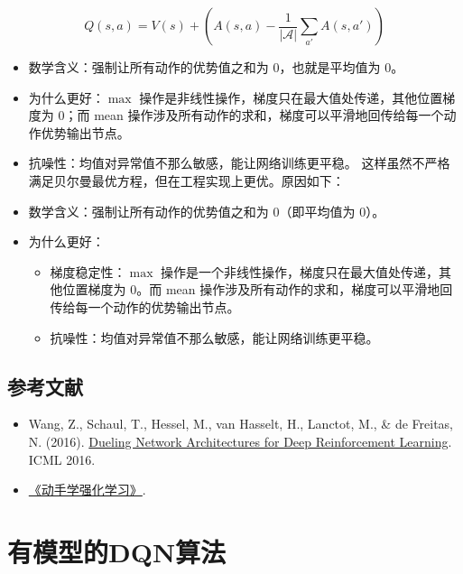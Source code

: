 \[
Q(s,a)=V(s)+(A(s,a)-\frac{1}{|\mathcal{A}|}\sum_{a'}A(s,a'))
\]

\begin{itemize}
\item
  数学含义：强制让所有动作的优势值之和为 \(0\)，也就是平均值为 \(0\)。
\item
  为什么更好：\(\max\) 操作是非线性操作，梯度只在最大值处传递，其他位置梯度为 \(0\)；而 mean 操作涉及所有动作的求和，梯度可以平滑地回传给每一个动作优势输出节点。
\item
  抗噪性：均值对异常值不那么敏感，能让网络训练更平稳。
  这样虽然不严格满足贝尔曼最优方程，但在工程实现上更优。原因如下：
\item
  数学含义：强制让所有动作的优势值之和为 \(0\)（即平均值为 \(0\)）。
\item
  为什么更好：

  \begin{itemize}
  \tightlist
  \item
    梯度稳定性：\(\max\) 操作是一个非线性操作，梯度只在最大值处传递，其他位置梯度为 \(0\)。而 mean 操作涉及所有动作的求和，梯度可以平滑地回传给每一个动作的优势输出节点。
  \item
    抗噪性：均值对异常值不那么敏感，能让网络训练更平稳。
  \end{itemize}
\end{itemize}

\hypertarget{ux53c2ux8003ux6587ux732e-52}{%
\subsection{参考文献}\label{ux53c2ux8003ux6587ux732e-52}}

\vspace{0.25em}
\begin{itemize}
\tightlist
\item
  Wang, Z., Schaul, T., Hessel, M., van Hasselt, H., Lanctot, M., \& de Freitas, N. (2016). \href{https://arxiv.org/abs/1511.06581}{Dueling Network Architectures for Deep Reinforcement Learning}. ICML 2016.
\item
  \href{https://hrl.boyuai.com/}{《动手学强化学习》}.
\end{itemize}

\clearpage

\hypertarget{ux6709ux6a21ux578bux7684dqnux7b97ux6cd5}{%
\section{有模型的DQN算法}\label{ux6709ux6a21ux578bux7684dqnux7b97ux6cd5}}


